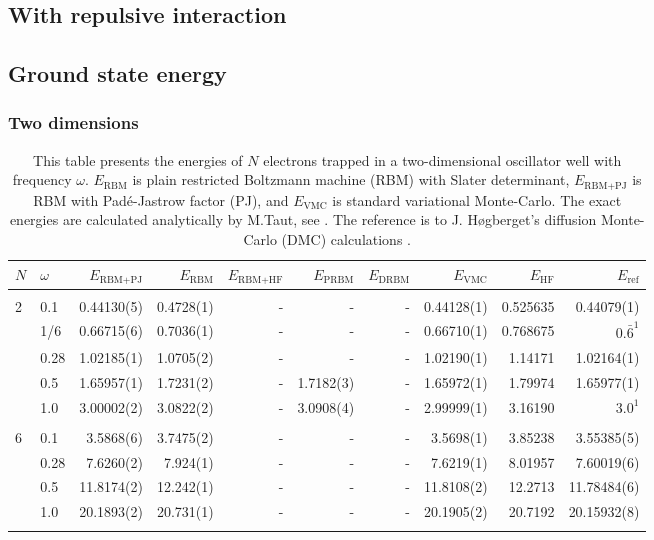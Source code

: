 \begin{landscape}
\section{With repulsive interaction}
\subsection{Ground state energy}
\subsubsection{Two dimensions}
\begin{table} [H]
	\caption{This table presents the energies of $N$ electrons trapped in a two-dimensional oscillator well with frequency $\omega$. $E_{\text{RBM}}$ is plain restricted Boltzmann machine (RBM) with Slater determinant, $E_{\text{RBM+PJ}}$ is RBM with Padé-Jastrow factor (PJ), and $E_{\text{VMC}}$ is standard variational Monte-Carlo. The exact energies are calculated analytically by M.Taut, see \cite{taut_two_1994}. The reference is to J. Høgberget's diffusion Monte-Carlo (DMC) calculations \cite{hogberget_quantum_2013}.} 
	\begin{tabularx}{\hsize}{l:l|RRRRRRRR} \hline\hline
		\label{tab:quantumdotswinteraction2D1}
		$N$ & $\omega$ & $E_{\text{RBM+PJ}}$ & $E_{\text{RBM}}$ & $E_{\text{RBM+HF}}$ & $E_{\text{PRBM}}$ & $E_{\text{DRBM}}$ & $E_{\text{VMC}}$ & $E_{\text{HF}}$ & $E_{\text{ref}}$ \\ \hline \\
		2 & 0.1 & 0.44130(5) & 0.4728(1) & - & - & - & 0.44128(1) & 0.525635 & 0.44079(1) \\ 
		& 1/6 & 0.66715(6) & 0.7036(1) & - & - & - & 0.66710(1) & 0.768675 & $0.\bar{6}^{1}$ \\
		& 0.28 & 1.02185(1) & 1.0705(2) & - & - & - & 1.02190(1) & 1.14171 & 1.02164(1) \\
		& 0.5 & 1.65957(1) & 1.7231(2) & - & 1.7182(3) & - & 1.65972(1) & 1.79974 & 1.65977(1)  \\
		& 1.0 & 3.00002(2) & 3.0822(2) & - & 3.0908(4) & - & 2.99999(1) & 3.16190 & $3.0^{1}$ \\ \hdashline \\

		6 & 0.1 & 3.5868(6) & 3.7475(2) & - & - & - & 3.5698(1) & 3.85238 & 3.55385(5) \\ 
		& 0.28 & 7.6260(2) & 7.924(1) & - & - & - & 7.6219(1) & 8.01957 & 7.60019(6) \\
		& 0.5 & 11.8174(2) & 12.242(1) & - & - & - & 11.8108(2) & 12.2713 & 11.78484(6) \\
		& 1.0 & 20.1893(2) & 20.731(1) & - & - & - & 20.1905(2) & 20.7192 & 20.15932(8) \\ \hdashline \\
		

\end{tabularx}
\end{table}
\end{landscape}
